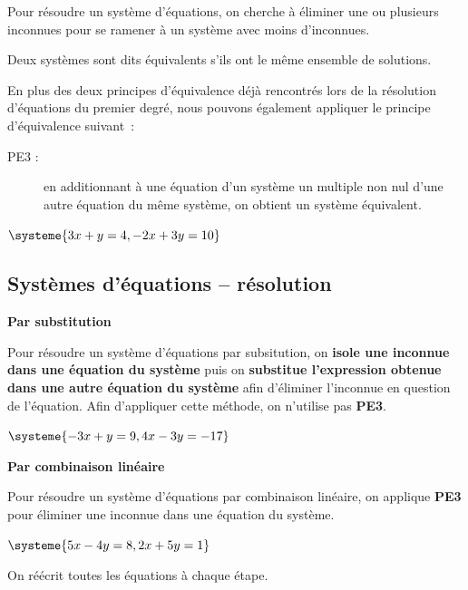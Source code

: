 \documentclass[a4paper,12pt]{article}
\begin{document}
Pour résoudre un système d'équations, on cherche à \og{}éliminer une ou plusieurs inconnues\fg{} pour se ramener à un système avec moins d'inconnues.


\begin{definition}
\tcblower
	Deux systèmes sont dits équivalents s'ils ont le même ensemble de solutions.
\end{definition}

En plus des deux principes d'équivalence déjà rencontrés lors de la résolution d'équations du premier degré, nous pouvons également appliquer le principe d'équivalence suivant~:
\begin{description}
	\item[PE3 :] en additionnant à une équation d'un système un multiple non nul d'une autre équation du même système, on obtient un système équivalent.
\end{description}

\begin{exemple}
	$\systeme{3x+y=4,-2x+3y=10}$
	\tcblower
\vspace{7cm}
\end{exemple}

\newpage
\subsection{Systèmes d'équations -- résolution}
\begin{center}
	{\bfseries Par substitution}
\end{center}
Pour résoudre un système d'équations par subsitution, on {\bfseries isole une inconnue dans une équation du système} puis on {\bfseries substitue l'expression obtenue dans une autre équation du système} afin \og{}d'éliminer\fg{} l'inconnue en question de l'équation. 
Afin d'appliquer cette méthode, on n'utilise pas {\bfseries PE3}.
\begin{exemple}
	$\systeme{-3x+y=9,4x-3y=-17}$
	\tcblower
\vspace{15cm}
\end{exemple}
\newpage
\begin{center}
{\bfseries Par combinaison linéaire}
\end{center}
Pour résoudre un système d'équations par combinaison linéaire, on applique {\bfseries PE3} pour éliminer une inconnue dans une équation du système.  
\begin{exemple}
	$\systeme{5x-4y=8,2x+5y=1}$
	\tcblower
\vspace{15cm}
\end{exemple}
\begin{remarque}
	\tcblower
	On réécrit toutes les équations à chaque étape.
\end{remarque}
\end{document}

